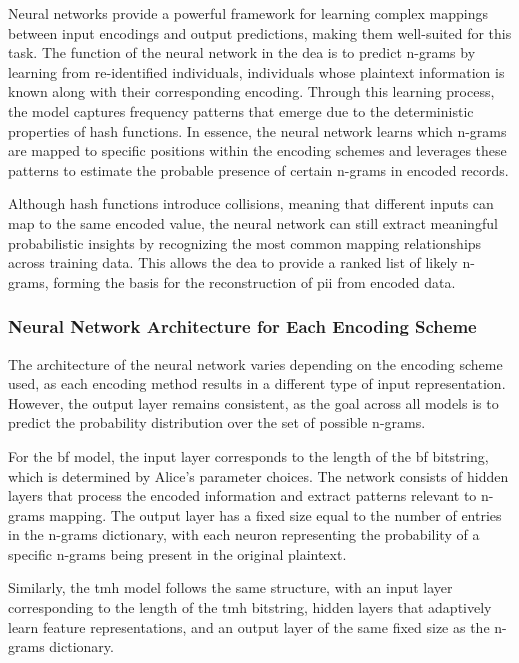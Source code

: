 Neural networks provide a powerful framework for learning complex mappings between input encodings and output predictions, making them well-suited for this task.
The function of the neural network in the \ac{dea} is to predict n-grams by learning from re-identified individuals, individuals whose plaintext information is known along with their corresponding encoding.
Through this learning process, the model captures frequency patterns that emerge due to the deterministic properties of hash functions.
In essence, the neural network learns which n-grams are mapped to specific positions within the encoding schemes and leverages these patterns to estimate the probable presence of certain n-grams in encoded records.

Although hash functions introduce collisions, meaning that different inputs can map to the same encoded value, the neural network can still extract meaningful probabilistic insights by recognizing the most common mapping relationships across training data.
This allows the \ac{dea} to provide a ranked list of likely n-grams, forming the basis for the reconstruction of \ac{pii} from encoded data.

\subsubsection{Neural Network Architecture for Each Encoding Scheme}

The architecture of the neural network varies depending on the encoding scheme used, as each encoding method results in a different type of input representation.
However, the output layer remains consistent, as the goal across all models is to predict the probability distribution over the set of possible n-grams.

For the \ac{bf} model, the input layer corresponds to the length of the \ac{bf} bitstring, which is determined by Alice’s parameter choices.
The network consists of hidden layers that process the encoded information and extract patterns relevant to n-grams mapping.
The output layer has a fixed size equal to the number of entries in the n-grams dictionary, with each neuron representing the probability of a specific n-grams being present in the original plaintext.

Similarly, the \ac{tmh} model follows the same structure, with an input layer corresponding to the length of the \ac{tmh} bitstring, hidden layers that adaptively learn feature representations, and an output layer of the same fixed size as the n-grams dictionary.

